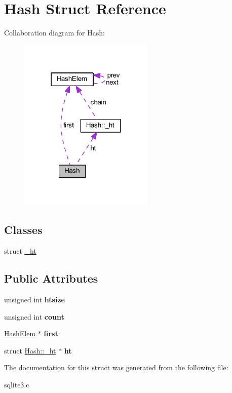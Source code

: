 \hypertarget{struct_hash}{\section{Hash Struct Reference}
\label{struct_hash}
}


Collaboration diagram for Hash\-:\nopagebreak
\begin{figure}[H]
\begin{center}
\leavevmode
\includegraphics[width=182pt]{struct_hash__coll__graph}
\end{center}
\end{figure}
\subsection*{Classes}
\begin{DoxyCompactItemize}
\item 
struct \hyperlink{struct_hash_1_1__ht}{\-\_\-ht}
\end{DoxyCompactItemize}
\subsection*{Public Attributes}
\begin{DoxyCompactItemize}
\item 
\hypertarget{struct_hash_a072258e24a38e09175f1308deb013bc8}{unsigned int {\bfseries htsize}}\label{struct_hash_a072258e24a38e09175f1308deb013bc8}

\item 
\hypertarget{struct_hash_a7ab16f173cdc347ffbe39eaa85ee6fda}{unsigned int {\bfseries count}}\label{struct_hash_a7ab16f173cdc347ffbe39eaa85ee6fda}

\item 
\hypertarget{struct_hash_a2cfc9936ca2a624c6492ab6557f4705b}{\hyperlink{struct_hash_elem}{Hash\-Elem} $\ast$ {\bfseries first}}\label{struct_hash_a2cfc9936ca2a624c6492ab6557f4705b}

\item 
\hypertarget{struct_hash_ac0f36e03746a3fe69643db08d93bc0c4}{struct \hyperlink{struct_hash_1_1__ht}{Hash\-::\-\_\-ht} $\ast$ {\bfseries ht}}\label{struct_hash_ac0f36e03746a3fe69643db08d93bc0c4}

\end{DoxyCompactItemize}


The documentation for this struct was generated from the following file\-:\begin{DoxyCompactItemize}
\item 
sqlite3.\-c\end{DoxyCompactItemize}
